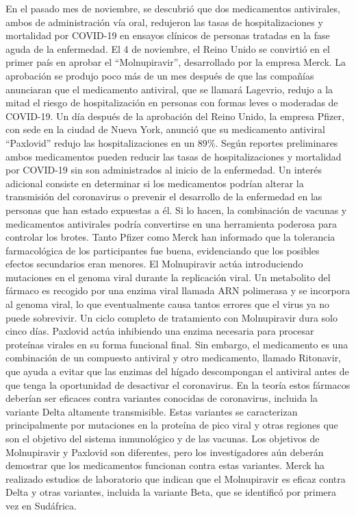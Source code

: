 \documentclass[12pt,a4paper,openany]{book}
\begin{document}
	En el pasado mes de noviembre, se descubrió que dos medicamentos antivirales, ambos de administración vía oral, redujeron las tasas de hospitalizaciones y mortalidad por COVID-19 en ensayos clínicos de personas tratadas en la fase aguda de la enfermedad.
	El 4 de noviembre, el Reino Unido se convirtió en el primer país en aprobar el “Molnupiravir”, desarrollado por la empresa Merck. La aprobación se produjo poco más de un mes después de que las compañías anunciaran que el medicamento antiviral, que se llamará Lagevrio, redujo a la mitad el riesgo de hospitalización en personas con formas leves o moderadas de COVID-19. Un día después de la aprobación del Reino Unido, la empresa Pfizer, con sede en la ciudad de Nueva York, anunció que su medicamento antiviral “Paxlovid” redujo las hospitalizaciones en un 89$\%$.
	Según reportes preliminares ambos medicamentos pueden reducir las tasas de hospitalizaciones y mortalidad por COVID-19 sin son administrados al inicio de la enfermedad. Un interés adicional consiste en determinar si los medicamentos podrían alterar la transmisión del coronavirus o prevenir el desarrollo de la enfermedad en las personas que han estado expuestas a él. Si lo hacen, la combinación de vacunas y medicamentos antivirales podría convertirse en una herramienta poderosa para controlar los brotes.
	Tanto Pfizer como Merck han informado que la tolerancia farmacológica de los participantes fue buena, evidenciando que los posibles efectos secundarios eran menores. El Molnupiravir actúa introduciendo mutaciones en el genoma viral durante la replicación viral. Un metabolito del fármaco es recogido por una enzima viral llamada ARN polimerasa y se incorpora al genoma viral, lo que eventualmente causa tantos errores que el virus ya no puede sobrevivir. Un ciclo completo de tratamiento con Molnupiravir dura solo cinco días.  Paxlovid actúa inhibiendo una enzima necesaria para procesar proteínas virales en su forma funcional final. Sin embargo, el medicamento es una combinación de un compuesto antiviral y otro medicamento, llamado Ritonavir, que ayuda a evitar que las enzimas del hígado descompongan el antiviral antes de que tenga la oportunidad de desactivar el coronavirus. 
	En la teoría estos fármacos deberían ser eficaces contra variantes conocidas de coronavirus, incluida la variante Delta altamente transmisible. Estas variantes se caracterizan principalmente por mutaciones en la proteína de pico viral y otras regiones que son el objetivo del sistema inmunológico y de las vacunas. Los objetivos de Molnupiravir y Paxlovid son diferentes, pero los investigadores aún deberán demostrar que los medicamentos funcionan contra estas variantes. Merck ha realizado estudios de laboratorio que indican que el Molnupiravir es eficaz contra Delta y otras variantes, incluida la variante Beta, que se identificó por primera vez en Sudáfrica.
\end{document}
